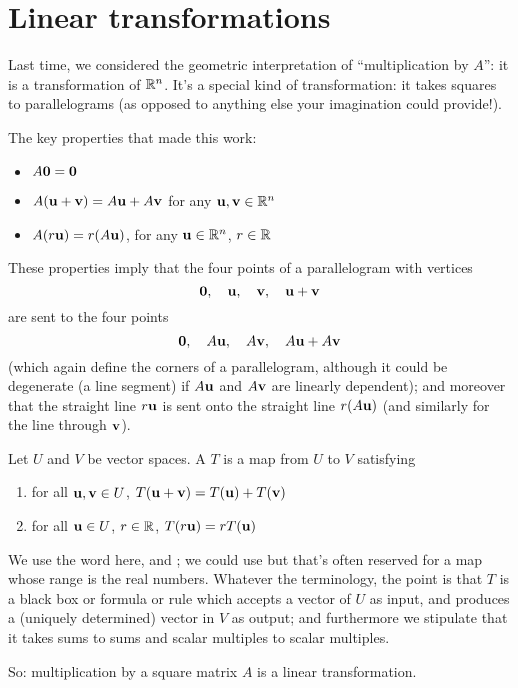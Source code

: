 \chapter{Linear transformations}
\label{chapter:24LT}


Last time, we considered the geometric interpretation of ``multiplication
by $A$'':  it is a transformation of $\mathbb{R}^n$.   It's a special
kind of transformation:  it takes squares to parallelograms (as opposed
to anything else your imagination could provide!).

The key properties that made this work:
\begin{itemize}
\item $A\mathbf{0} = \mathbf{0}$
\item $A(\mathbf{u} + \mathbf{v}) = A\mathbf{u} + A\mathbf{v}$ for any $\mathbf{u},\mathbf{v} \in \mathbb{R}^n$
\item $A(r\mathbf{u}) = r(A\mathbf{u})$, for any $\mathbf{u}\in\mathbb{R}^n$, $r\in\mathbb{R}$
\end{itemize}
These properties imply that the four points
of a parallelogram with vertices 
$$
\mathbf{0},\quad \mathbf{u},\quad \mathbf{v}, \quad\mathbf{u}+\mathbf{v}
$$
 are
sent to the four points 
$$
\mathbf{0},\quad A\mathbf{u}, \quad A\mathbf{v}, \quad A\mathbf{u} + A\mathbf{v}
$$
(which again define the corners of a parallelogram, although it could
be degenerate (a line segment) if $A\mathbf{u}$ and $A\mathbf{v}$ are linearly
dependent); and moreover
that the straight line $r\mathbf{u}$ is sent onto the straight line
$r(A\mathbf{u})$ (and similarly for the line through $\mathbf{v}$).


\begin{definition}
Let $U$ and $V$ be vector spaces.  A  $T$
is a map from $U$ to $V$ satisfying 
\begin{enumerate}
\item for all $\mathbf{u},\mathbf{v}\in U$, $T(\mathbf{u}+\mathbf{v}) = T(\mathbf{u})+T(\mathbf{v})$
\item for all $\mathbf{u} \in U$, $r\in\mathbb{R}$, $T(r\mathbf{u}) = rT(\mathbf{u})$
\end{enumerate}
\end{definition}

We use the word  here, and ;
we could use  but that's often reserved for
a map whose range is the real numbers.  Whatever the terminology,
the point is that $T$ is a black box or formula or rule which
accepts a vector of $U$ as input, and produces a (uniquely determined) 
vector in $V$
as output; and furthermore we stipulate that it takes sums to sums
and scalar multiples to scalar multiples.  

So:  multiplication by a square matrix $A$ is a linear transformation.

